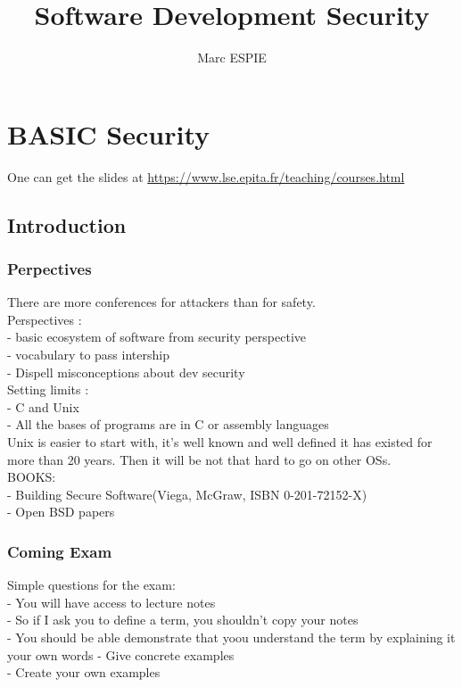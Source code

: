 \documentclass[a4paper,11pt]{article}
\title{Software Development Security}
\author{Marc ESPIE}
\begin{document}
\maketitle
\tableofcontents
\newpage

\section{BASIC Security}

One can get the slides at \url{https://www.lse.epita.fr/teaching/courses.html}

\subsection{Introduction}
\subsubsection{Perpectives}
There are more conferences for attackers than for safety.\\

Perspectives :\\
- basic ecosystem of software from security perspective\\
- vocabulary to pass intership\\
- Dispell misconceptions about dev security\\

Setting limits :\\
- C and Unix\\
- All the bases of programs are in C or assembly languages\\

Unix is easier to start with, it's well known and well defined
it has existed for more than 20 years. Then it will be not that hard to go on other OSs.\\

BOOKS:\\
- Building Secure Software(Viega, McGraw, ISBN  0-201-72152-X)\\
- Open BSD papers\\

\subsubsection{Coming Exam}

Simple questions for the exam:\\
- You will have access to lecture notes\\
- So if I ask you to define a term, you shouldn't copy your notes\\
- You should be able demonstrate that yoou understand the term by explaining it your own words
- Give concrete examples\\
- Create your own examples\\
\end{document}
